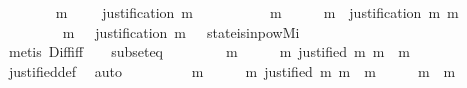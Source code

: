 \begin{isabellebody}
\ \ \ \ \isamarkupfalse%
\ {\isachardoublequoteopen}{\isasymnot}\ {\isacharparenleft}{\isasymexists}\ m\ {\isasymin}\ {\isasymsigma}\ {\isacharminus}\ {\isasymsigma}{\isacharprime}{\isachardot}\ justification\ m\ {\isasymsubseteq}\ {\isasymsigma}{\isacharprime}{\isacharparenright}{\isachardoublequoteclose}\isanewline
\ \ \ \ \isamarkupfalse%
\ \isamarkupfalse%
\ {\isachardoublequoteopen}{\isasymforall}\ m\ {\isasymin}\ {\isasymsigma}\ {\isacharminus}\ {\isasymsigma}{\isacharprime}{\isachardot}\ {\isasymexists}\ m{\isacharprime}\ {\isasymin}\ justification\ m{\isachardot}\ m{\isacharprime}\ {\isasymin}\ {\isasymsigma}\ {\isacharminus}\ {\isasymsigma}{\isacharprime}{\isachardoublequoteclose}\isanewline
\ \ \ \ \ \ \isamarkupfalse%
\ {\isacartoucheopen}{\isasymnot}\ {\isacharparenleft}{\isasymexists}m{\isasymin}{\isasymsigma}\ {\isacharminus}\ {\isasymsigma}{\isacharprime}{\isachardot}\ justification\ m\ {\isasymsubseteq}\ {\isasymsigma}{\isacharprime}{\isacharparenright}{\isacartoucheclose}\ state{\isacharunderscore}is{\isacharunderscore}in{\isacharunderscore}pow{\isacharunderscore}M{\isacharunderscore}i\ {\isacartoucheopen}{\isasymsigma}{\isacharprime}\ {\isasymsubset}\ {\isasymsigma}{\isacartoucheclose}\isanewline
\ \ \ \ \ \ \isamarkupfalse%
\ {\isacharparenleft}metis\ Diff{\isacharunderscore}iff\ {\isacartoucheopen}{\isasymsigma}\ {\isasymin}\ {\isasymSigma}{\isacartoucheclose}\ subset{\isacharunderscore}eq{\isacharparenright}\isanewline
\ \ \ \ \isamarkupfalse%
\ \isamarkupfalse%
\ {\isachardoublequoteopen}{\isasymforall}\ m\ {\isasymin}\ {\isasymsigma}\ {\isacharminus}\ {\isasymsigma}{\isacharprime}{\isachardot}\ {\isasymexists}\ m{\isacharprime}{\isachardot}\ justified\ m{\isacharprime}\ m\ {\isasymand}\ m{\isacharprime}\ {\isasymin}\ {\isasymsigma}\ {\isacharminus}\ {\isasymsigma}{\isacharprime}{\isachardoublequoteclose}\isanewline
\ \ \ \ \ \ \isamarkupfalse%
\ justified{\isacharunderscore}def\ \isamarkupfalse%
\ auto\ \isanewline
\ \ \ \ \isamarkupfalse%
\ \isamarkupfalse%
\ {\isachardoublequoteopen}{\isasymforall}\ m\ {\isasymin}\ {\isasymsigma}\ {\isacharminus}\ {\isasymsigma}{\isacharprime}{\isachardot}\ {\isasymexists}\ m{\isacharprime}{\isachardot}\ justified\ m{\isacharprime}\ m\ {\isasymand}\ m{\isacharprime}\ {\isasymin}\ {\isasymsigma}\ {\isacharminus}\ {\isasymsigma}{\isacharprime}\ {\isasymand}\ m\ {\isasymnoteq}\ m{\isacharprime}{\isachardoublequoteclose}\ \isanewline

\end{isabellebody}
